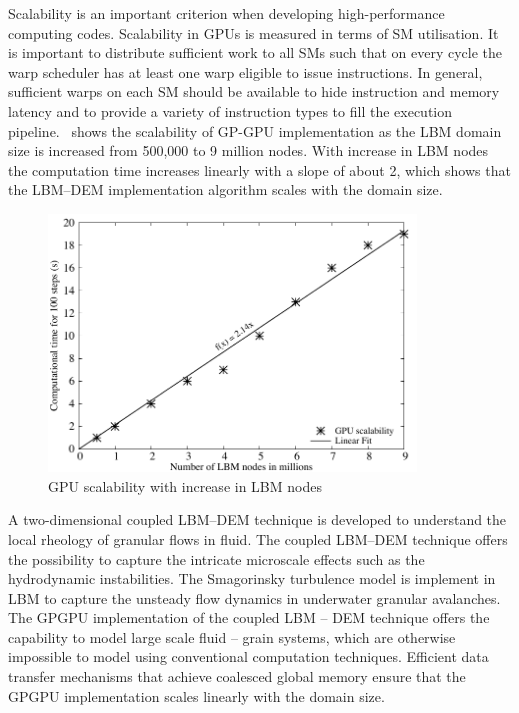 Scalability is an important criterion when developing high-performance 
computing codes. Scalability in GPUs is measured in terms of SM utilisation. It 
is important to distribute sufficient work to all SMs such that on every cycle 
the warp scheduler has at least one warp eligible to issue instructions. In 
general, sufficient warps on each SM should be available to hide instruction 
and memory latency and to provide a variety of instruction types to 
fill the execution pipeline.~ shows the scalability of 
GP-GPU implementation as the LBM domain size is increased from 500,000 to 9 
million nodes. With increase in LBM nodes the computation time increases 
linearly with a slope of about 2, which shows that the LBM--DEM implementation 
algorithm scales with the domain size.

\begin{figure}[tbhp]
	\centering
	\includegraphics[width=0.87\textwidth]{GPU_Speedup}
	\caption{GPU scalability with increase in LBM nodes}
	\label{fig:GPUSpeed}
\end{figure}

A two-dimensional coupled LBM--DEM technique is developed to understand the 
local rheology of granular flows in fluid. The coupled LBM--DEM technique 
offers the possibility to capture the intricate microscale effects such as the 
hydrodynamic instabilities. The Smagorinsky turbulence model is implement in 
LBM to capture the unsteady flow dynamics in underwater granular avalanches. 
The GPGPU implementation of the coupled LBM -- DEM technique offers the 
capability to model large scale fluid -- grain systems, which are otherwise 
impossible to model using conventional computation techniques. Efficient data 
transfer mechanisms that achieve coalesced global memory ensure that the 
GPGPU implementation scales linearly with the domain size.
